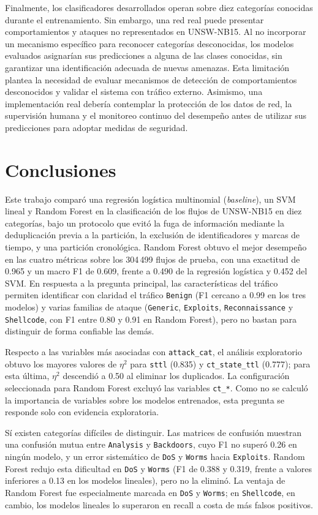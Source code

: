 \documentclass[conference]{IEEEtran}
\begin{document}
Finalmente, los clasificadores desarrollados operan sobre diez categorías conocidas durante el entrenamiento. Sin embargo, una red real puede presentar comportamientos y ataques no representados en UNSW-NB15. Al no incorporar un mecanismo específico para reconocer categorías desconocidas, los modelos evaluados asignarían sus predicciones a alguna de las clases conocidas, sin garantizar una identificación adecuada de nuevas amenazas. Esta limitación plantea la necesidad de evaluar mecanismos de detección de comportamientos desconocidos y validar el sistema con tráfico externo. Asimismo, una implementación real debería contemplar la protección de los datos de red, la supervisión humana y el monitoreo continuo del desempeño antes de utilizar sus predicciones para adoptar medidas de seguridad.


\section{Conclusiones}

Este trabajo comparó una regresión logística multinomial (\textit{baseline}), un SVM lineal y Random Forest en la clasificación de los flujos de UNSW-NB15 en diez categorías, bajo un protocolo que evitó la fuga de información mediante la deduplicación previa a la partición, la exclusión de identificadores y marcas de tiempo, y una partición cronológica. Random Forest obtuvo el mejor desempeño en las cuatro métricas sobre los 304\,499 flujos de prueba, con una exactitud de 0.965 y un macro F1 de 0.609, frente a 0.490 de la regresión logística y 0.452 del SVM. En respuesta a la pregunta principal, las características del tráfico permiten identificar con claridad el tráfico \texttt{Benign} (F1 cercano a 0.99 en los tres modelos) y varias familias de ataque (\texttt{Generic}, \texttt{Exploits}, \texttt{Reconnaissance} y \texttt{Shellcode}, con F1 entre 0.80 y 0.91 en Random Forest), pero no bastan para distinguir de forma confiable las demás.

Respecto a las variables más asociadas con \texttt{attack\_cat}, el análisis exploratorio obtuvo los mayores valores de $\eta^2$ para \texttt{sttl} (0.835) y \texttt{ct\_state\_ttl} (0.777); para esta última, $\eta^2$ descendió a 0.50 al eliminar los duplicados. La configuración seleccionada para Random Forest excluyó las variables \texttt{ct\_*}. Como no se calculó la importancia de variables sobre los modelos entrenados, esta pregunta se responde solo con evidencia exploratoria.

Sí existen categorías difíciles de distinguir. Las matrices de confusión muestran una confusión mutua entre \texttt{Analysis} y \texttt{Backdoors}, cuyo F1 no superó 0.26 en ningún modelo, y un error sistemático de \texttt{DoS} y \texttt{Worms} hacia \texttt{Exploits}. Random Forest redujo esta dificultad en \texttt{DoS} y \texttt{Worms} (F1 de 0.388 y 0.319, frente a valores inferiores a 0.13 en los modelos lineales), pero no la eliminó. La ventaja de Random Forest fue especialmente marcada en \texttt{DoS} y \texttt{Worms}; en \texttt{Shellcode}, en cambio, los modelos lineales lo superaron en recall a costa de más falsos positivos.
\end{document}
